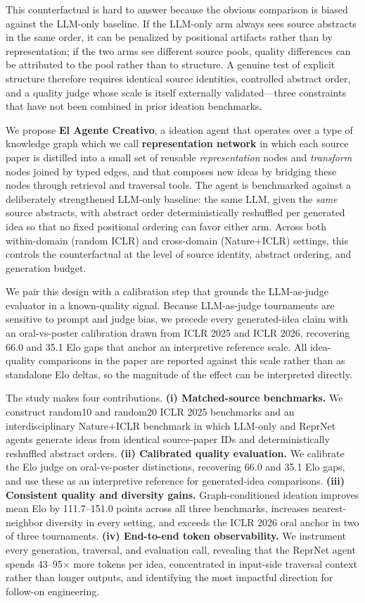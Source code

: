 \documentclass[10pt,twocolumn]{article}
\begin{document}
This counterfactual is hard to answer because the obvious comparison is
biased against the LLM-only baseline.  If the LLM-only arm always sees source
abstracts in the same order, it can be penalized by positional artifacts
rather than by representation; if the two arms see different source pools,
quality differences can be attributed to the pool rather than to structure.
A genuine test of explicit structure therefore requires identical source
identities, controlled abstract order, and a quality judge whose scale is
itself externally validated---three constraints that have not been combined
in prior ideation benchmarks.

We propose \textbf{El Agente Creativo}, a 
ideation agent that operates over a type of knowledge graph which we call \textbf{representation network} in which each
source paper is distilled into a small set of reusable \emph{representation}
nodes and \emph{transform} nodes joined by typed edges, and that composes
new ideas by bridging these nodes through retrieval and traversal tools.
The agent is benchmarked against a deliberately strengthened LLM-only
baseline: the same LLM, given the \emph{same} source abstracts, with
abstract order deterministically reshuffled per generated idea so that no
fixed positional ordering can favor either arm.  Across both
within-domain (random ICLR) and cross-domain (Nature+ICLR) settings, this
controls the counterfactual at the level of source identity, abstract
ordering, and generation budget.

We pair this design with a calibration step that grounds the LLM-as-judge
evaluator in a known-quality signal.  Because LLM-as-judge tournaments are
sensitive to prompt and judge bias, we precede every generated-idea claim
with an oral-vs-poster calibration drawn from ICLR 2025 and ICLR 2026,
recovering 66.0 and 35.1 Elo gaps that anchor an interpretive reference
scale.  All idea-quality comparisons in the paper are reported against
this scale rather than as standalone Elo deltas, so the magnitude of the
effect can be interpreted directly.

The study makes four contributions.
\textbf{(i) Matched-source benchmarks.}  We construct random10 and
random20 ICLR 2025 benchmarks and an interdisciplinary Nature+ICLR
benchmark in which LLM-only and ReprNet agents generate ideas from identical
source-paper IDs and deterministically reshuffled abstract orders.
\textbf{(ii) Calibrated quality evaluation.}  We calibrate the Elo judge
on oral-vs-poster distinctions, recovering 66.0 and 35.1 Elo gaps, and use
these as an interpretive reference for generated-idea comparisons.
\textbf{(iii) Consistent quality and diversity gains.}  Graph-conditioned
ideation improves mean Elo by 111.7--151.0 points across all three
benchmarks, increases nearest-neighbor diversity in every setting, and
exceeds the ICLR 2026 oral anchor in two of three tournaments.
\textbf{(iv) End-to-end token observability.}  We instrument every
generation, traversal, and evaluation call, revealing that the ReprNet agent
spends 43--95$\times$ more tokens per idea, concentrated in input-side
traversal context rather than longer outputs, and identifying the most
impactful direction for follow-on engineering.
\end{document}
